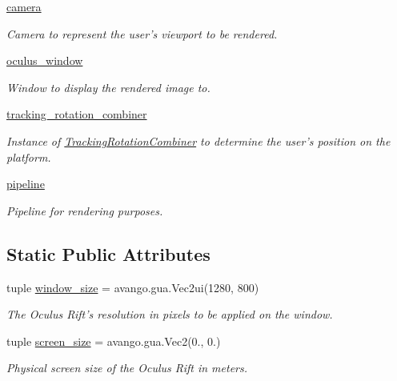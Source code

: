\begin{DoxyCompactItemize}
\hyperlink{classlib_1_1OVRUser_1_1OVRUser_ac53e8feacced96176082bcae4965a2a3}{camera}
\begin{DoxyCompactList}\small\item\em \-Camera to represent the user's viewport to be rendered. \end{DoxyCompactList}\item 
\hyperlink{classlib_1_1OVRUser_1_1OVRUser_aa4d62ccc0d5383b9745d2e0a614c1a1e}{oculus\-\_\-window}
\begin{DoxyCompactList}\small\item\em \-Window to display the rendered image to. \end{DoxyCompactList}\item 
\hyperlink{classlib_1_1OVRUser_1_1OVRUser_ac748c2459c90d3460469c92ee29d8643}{tracking\-\_\-rotation\-\_\-combiner}
\begin{DoxyCompactList}\small\item\em \-Instance of \hyperlink{classlib_1_1OVRUser_1_1TrackingRotationCombiner}{\-Tracking\-Rotation\-Combiner} to determine the user's position on the platform. \end{DoxyCompactList}\item 
\hyperlink{classlib_1_1OVRUser_1_1OVRUser_a3c172f5ff378e0a8c9bd5f0d78043e49}{pipeline}
\begin{DoxyCompactList}\small\item\em \-Pipeline for rendering purposes. \end{DoxyCompactList}\end{DoxyCompactItemize}
\subsection*{\-Static \-Public \-Attributes}
\begin{DoxyCompactItemize}
\item 
tuple \hyperlink{classlib_1_1OVRUser_1_1OVRUser_a5b47ee362acca69026189c9f88b67bd5}{window\-\_\-size} = avango.\-gua.\-Vec2ui(1280, 800)
\begin{DoxyCompactList}\small\item\em \-The \-Oculus \-Rift's resolution in pixels to be applied on the window. \end{DoxyCompactList}\item 
tuple \hyperlink{classlib_1_1OVRUser_1_1OVRUser_a7ea5c859dad1fc35e920762d7414e605}{screen\-\_\-size} = avango.\-gua.\-Vec2(0., 0.)
\begin{DoxyCompactList}\small\item\em \-Physical screen size of the \-Oculus \-Rift in meters. \end{DoxyCompactList}\end{DoxyCompactItemize}


